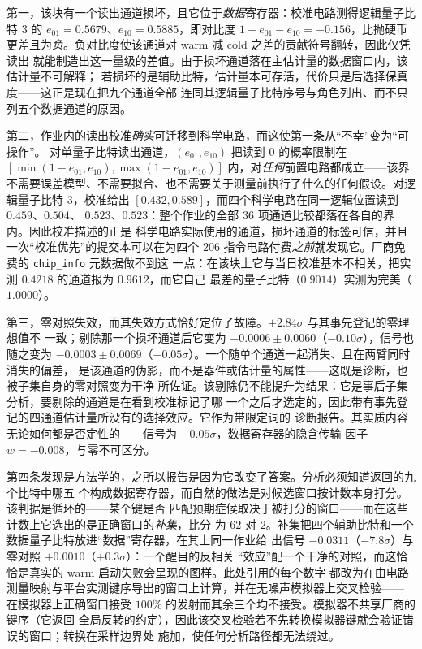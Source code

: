 \documentclass[11pt,a4paper]{article}
\begin{document}
第一，该块有一个读出通道损坏，且它位于\emph{数据}寄存器：校准电路测得逻辑量子比特
$3$ 的 $e_{01}=0.5679$、$e_{10}=0.5885$，即对比度 $1-e_{01}-e_{10}=-0.156$，比抛硬币
更差且为\emph{负}。负对比度使该通道对 warm 减 cold 之差的贡献符号翻转，因此仅凭读出
就能制造出这一量级的差值。由于损坏通道落在主估计量的数据窗口内，该估计量不可解释；
若损坏的是辅助比特，估计量本可存活，代价只是后选择保真度——这正是现在把九个通道全部
连同其逻辑量子比特序号与角色列出、而不只列五个数据通道的原因。

第二，作业内的读出校准\emph{确实}可迁移到科学电路，而这使第一条从“不幸”变为“可操作”。
对单量子比特读出通道，$(e_{01},e_{10})$ 把读到 $0$ 的概率限制在
$[\min(1-e_{01},e_{10}),\max(1-e_{01},e_{10})]$ 内，对\emph{任何}前置电路都成立——该界
不需要误差模型、不需要拟合、也不需要关于测量前执行了什么的任何假设。对逻辑量子比特
$3$，校准给出 $[0.432,0.589]$，而四个科学电路在同一逻辑位置读到 $0.459$、$0.504$、
$0.523$、$0.523$：整个作业的全部 $36$ 项通道比较都落在各自的界内。因此校准描述的正是
科学电路实际使用的通道，损坏通道的标签可信，并且一次“校准优先”的提交本可以在为四个
$206$ 指令电路付费\emph{之前}就发现它。厂商免费的 \texttt{chip\_info} 元数据做不到这
一点：在该块上它与当日校准基本不相关，把实测 $0.4218$ 的通道报为 $0.9612$，而它自己
最差的量子比特（$0.9014$）实测为完美（$1.0000$）。

第三，零对照失效，而其失效方式恰好定位了故障。$+2.84\sigma$ 与其事先登记的零理想值不
一致；剔除那一个损坏通道后它变为 $-0.0006\pm0.0060$（$-0.10\sigma$），信号也随之变为
$-0.0003\pm0.0069$（$-0.05\sigma$）。一个随单个通道一起消失、且在两臂同时消失的偏差，
是该通道的伪影，而不是器件或估计量的属性——这既是诊断，也被子集自身的零对照变为干净
所佐证。该剔除仍不能提升为结果：它是事后子集分析，要剔除的通道是在看到校准标记了哪
一个之后才选定的，因此带有事先登记的四通道估计量所没有的选择效应。它作为带限定词的
诊断报告。其实质内容无论如何都是否定性的——信号为 $-0.05\sigma$，数据寄存器的隐含传输
因子 $w=-0.008$，与零不可区分。

第四条发现是方法学的，之所以报告是因为它改变了答案。分析必须知道返回的九个比特中哪五
个构成数据寄存器，而自然的做法是对候选窗口按计数本身打分。该判据是循环的——某个键是否
匹配预期症候取决于被打分的窗口——而在这些计数上它选出的是正确窗口的\emph{补集}，比分
为 $62$ 对 $2$。补集把四个辅助比特和一个数据量子比特放进“数据”寄存器，在其上同一作业给
出信号 $-0.0311$（$-7.8\sigma$）与零对照 $+0.0010$（$+0.3\sigma$）：一个醒目的反相关
“效应”配一个干净的对照，而这恰恰是真实的 warm 启动失败会呈现的图样。此处引用的每个数字
都改为在由电路测量映射与平台实测键序导出的窗口上计算，并在无噪声模拟器上交叉检验——
在模拟器上正确窗口接受 $100\%$ 的发射而其余三个均不接受。模拟器不共享厂商的键序（它返回
全局反转的约定），因此该交叉检验若不先转换模拟器键就会验证错误的窗口；转换在采样边界处
施加，使任何分析路径都无法绕过。
\end{document}

